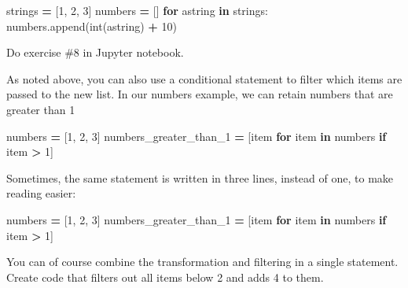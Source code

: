 \documentclass[
]{book}
\newenvironment{Shaded}{\begin{snugshade}}{\end{snugshade}}
\newcommand{\BuiltInTok}[1]{#1}
\newcommand{\ControlFlowTok}[1]{\textcolor[rgb]{0.13,0.29,0.53}{\textbf{#1}}}
\newcommand{\DecValTok}[1]{\textcolor[rgb]{0.00,0.00,0.81}{#1}}
\newcommand{\KeywordTok}[1]{\textcolor[rgb]{0.13,0.29,0.53}{\textbf{#1}}}
\newcommand{\NormalTok}[1]{#1}
\newcommand{\OperatorTok}[1]{\textcolor[rgb]{0.81,0.36,0.00}{\textbf{#1}}}
\newcommand{\StringTok}[1]{\textcolor[rgb]{0.31,0.60,0.02}{#1}}
\begin{document}
\begin{Shaded}
\begin{Highlighting}[]
\NormalTok{strings }\OperatorTok{=}\NormalTok{ [}\StringTok{\textquotesingle{}1\textquotesingle{}}\NormalTok{, }\StringTok{\textquotesingle{}2\textquotesingle{}}\NormalTok{, }\StringTok{\textquotesingle{}3\textquotesingle{}}\NormalTok{]}
\NormalTok{numbers }\OperatorTok{=}\NormalTok{ []}
\ControlFlowTok{for}\NormalTok{ astring }\KeywordTok{in}\NormalTok{ strings:}
\NormalTok{    numbers.append(}\BuiltInTok{int}\NormalTok{(astring) }\OperatorTok{+} \DecValTok{10}\NormalTok{)}
\end{Highlighting}
\end{Shaded}

Do exercise \#8 in Jupyter notebook.

As noted above, you can also use a conditional statement to filter which items are passed to the new list. In our numbers example, we can retain numbers that are greater than 1

\begin{Shaded}
\begin{Highlighting}[]
\NormalTok{numbers }\OperatorTok{=}\NormalTok{ [}\DecValTok{1}\NormalTok{, }\DecValTok{2}\NormalTok{, }\DecValTok{3}\NormalTok{]}
\NormalTok{numbers\_greater\_than\_1 }\OperatorTok{=}\NormalTok{ [item }\ControlFlowTok{for}\NormalTok{ item }\KeywordTok{in}\NormalTok{ numbers }\ControlFlowTok{if}\NormalTok{ item }\OperatorTok{\textgreater{}} \DecValTok{1}\NormalTok{]}
\end{Highlighting}
\end{Shaded}

Sometimes, the same statement is written in three lines, instead of one, to make reading easier:

\begin{Shaded}
\begin{Highlighting}[]
\NormalTok{numbers }\OperatorTok{=}\NormalTok{ [}\DecValTok{1}\NormalTok{, }\DecValTok{2}\NormalTok{, }\DecValTok{3}\NormalTok{]}
\NormalTok{numbers\_greater\_than\_1 }\OperatorTok{=}\NormalTok{ [item }
                          \ControlFlowTok{for}\NormalTok{ item }\KeywordTok{in}\NormalTok{ numbers}
                          \ControlFlowTok{if}\NormalTok{ item }\OperatorTok{\textgreater{}} \DecValTok{1}\NormalTok{]}
\end{Highlighting}
\end{Shaded}

You can of course combine the transformation and filtering in a single statement. Create code that filters out all items below 2 and adds 4 to them.
\end{document}
